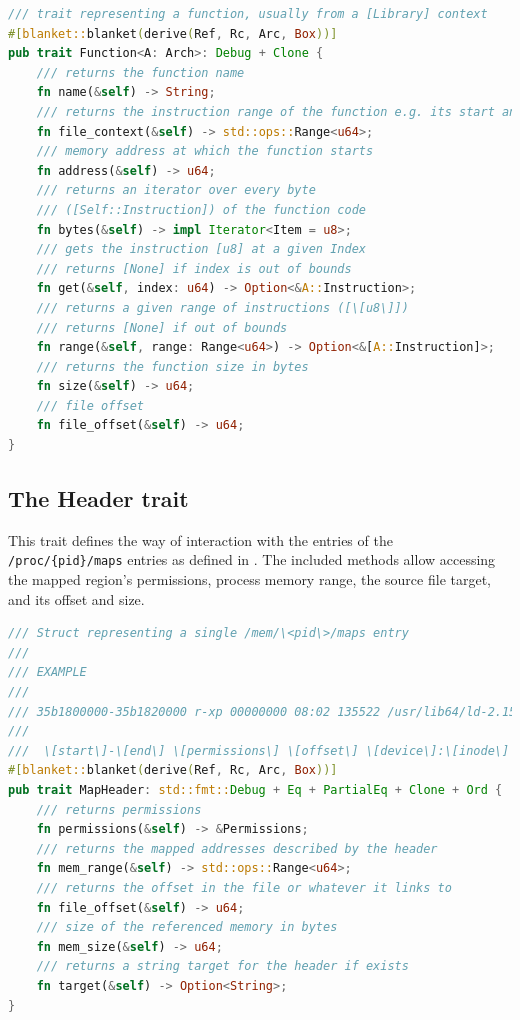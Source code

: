 \begin{lstlisting}[caption=\label{lst:function}{The Function Trait definition}, language=Rust]
/// trait representing a function, usually from a [Library] context
#[blanket::blanket(derive(Ref, Rc, Arc, Box))]
pub trait Function<A: Arch>: Debug + Clone {
    /// returns the function name
    fn name(&self) -> String;
    /// returns the instruction range of the function e.g. its start and end
    fn file_context(&self) -> std::ops::Range<u64>;
    /// memory address at which the function starts
    fn address(&self) -> u64;
    /// returns an iterator over every byte 
    /// ([Self::Instruction]) of the function code
    fn bytes(&self) -> impl Iterator<Item = u8>;
    /// gets the instruction [u8] at a given Index
    /// returns [None] if index is out of bounds
    fn get(&self, index: u64) -> Option<&A::Instruction>;
    /// returns a given range of instructions ([\[u8\]])
    /// returns [None] if out of bounds
    fn range(&self, range: Range<u64>) -> Option<&[A::Instruction]>;
    /// returns the function size in bytes
    fn size(&self) -> u64;
    /// file offset
    fn file_offset(&self) -> u64;
}
\end{lstlisting}

    \subsection{The Header trait}
     \label{reader:header}

    This trait defines the way of interaction with the entries of the \verb|/proc/{pid}/maps| entries as defined in \cite{kerrisk_proc_pid_maps5_2024}.
    The included methods allow accessing the mapped region's permissions, process memory range, the source file target, and its offset and size.
\begin{lstlisting}[caption=\label{lst:header}{The Header Trait definition}, language=Rust]
/// Struct representing a single /mem/\<pid\>/maps entry
///
/// EXAMPLE
///
/// 35b1800000-35b1820000 r-xp 00000000 08:02 135522 /usr/lib64/ld-2.15.so
///
///  \[start\]-\[end\] \[permissions\] \[offset\] \[device\]:\[inode\] \[links_to\]
#[blanket::blanket(derive(Ref, Rc, Arc, Box))]
pub trait MapHeader: std::fmt::Debug + Eq + PartialEq + Clone + Ord {
    /// returns permissions
    fn permissions(&self) -> &Permissions;
    /// returns the mapped addresses described by the header
    fn mem_range(&self) -> std::ops::Range<u64>;
    /// returns the offset in the file or whatever it links to
    fn file_offset(&self) -> u64;
    /// size of the referenced memory in bytes
    fn mem_size(&self) -> u64;
    /// returns a string target for the header if exists
    fn target(&self) -> Option<String>;
}    
\end{lstlisting}


